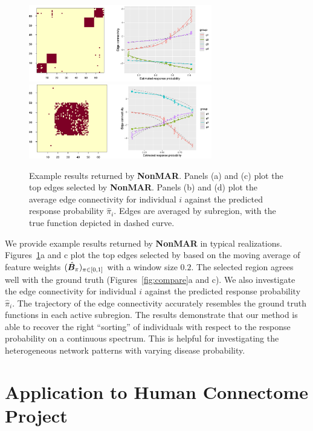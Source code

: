 \documentclass[11pt]{article}
\theoremstyle{definition}
\def\NonparaM{\text{\bf \small NonMAR }}
\begin{document}
\begin{figure}[ht]
    \centering
   \includegraphics[width=8cm]{F10.pdf}
          \includegraphics[width=8cm]{F14.pdf}
 \caption{Example results returned by {\bf \small NonMAR}. Panels (a) and (c) plot the top edges selected by {\bf \small NonMAR}. Panels (b) and (d) plot the average edge connectivity for individual $i$ against the predicted response probability $\hat \pi_i$. Edges are averaged by subregion, with the true function depicted in dashed curve.}\label{fig:compare2}
  \vspace{-.5cm}
\end{figure}


We provide example results returned by {\bf \small NonMAR} in typical realizations. Figures~\ref{fig:compare2}a and c plot the top edges selected by \NonparaM based on the moving average of feature weights $(\hat {\bm B}_\pi)_{\pi\in[0,1]}$ with a window size $0.2$. The selected region agrees well with the ground truth (Figures~\ref{fig:compare}a and c). We also investigate the edge connectivity for individual $i$ against the predicted response probability $\hat \pi_i$. The trajectory of the edge connectivity accurately resembles the ground truth functions in each active subregion. The results demonstrate that our method is able to recover the right ``sorting'' of individuals with respect to the response probability on a continuous spectrum. This is helpful for investigating the heterogeneous network patterns with varying disease probability. 

\vspace{-.5cm}
\section{Application to Human Connectome Project}
\vspace{-.5cm}
\end{document}
